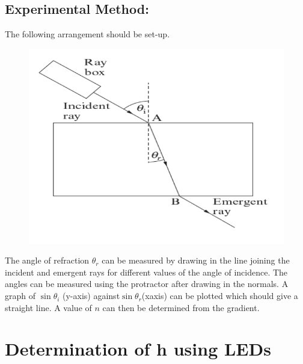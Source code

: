 \documentclass{tufte-handout}
\begin{document}
\subsection{Experimental Method:}  
The following arrangement should be set-up.  
\begin{figure}
\includegraphics[width=\textwidth]{snells.PNG}
\end{figure}
The angle of refraction $\theta_{r}$ can be measured by drawing in the line joining the incident and emergent rays for different values of the angle of incidence. The angles can be measured using the protractor after drawing in the normals. A graph of $\sin\theta_{i}$ (y-axis) against$\sin \theta_{r}$(xaxis) can be plotted which should give a straight line. A value of $n$ can then be determined from the gradient. 
\section{Determination of h using LEDs}
\end{document}
